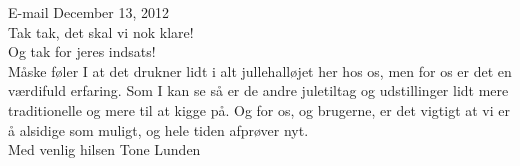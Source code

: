 \begin{fancyquotes}
E-mail December 13, 2012\\
Tak tak, det skal vi nok klare!\\

Og tak for jeres indsats!\\
M{\aa}ske f{\o}ler I at det drukner lidt i alt jullehall{\o}jet her hos os, men for os er det en v{\ae}rdifuld erfaring. Som I kan se s{\aa} er de andre juletiltag og udstillinger lidt mere traditionelle og mere til at kigge p{\aa}. Og for os, og brugerne, er det vigtigt at vi er {\aa} alsidige som muligt, og hele tiden afpr{\o}ver nyt.\\

Med venlig hilsen
Tone Lunden
\end{fancyquotes}

